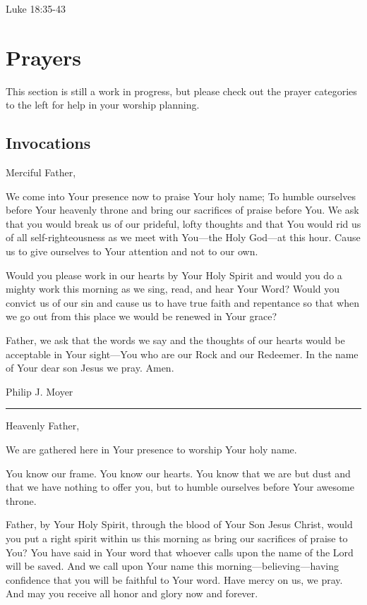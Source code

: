 \documentclass[]{book}
\begin{document}
Luke 18:35-43 \textbar{}

\chapter{Prayers}\label{prayers}

This section is still a work in progress, but please check out the
prayer categories to the left for help in your worship planning.

\section{Invocations}\label{invocations}

Merciful Father,

We come into Your presence now to praise Your holy name; To humble
ourselves before Your heavenly throne and bring our sacrifices of praise
before You. We ask that you would break us of our prideful, lofty
thoughts and that You would rid us of all self-righteousness as we meet
with You---the Holy God---at this hour. Cause us to give ourselves to
Your attention and not to our own.

Would you please work in our hearts by Your Holy Spirit and would you do
a mighty work this morning as we sing, read, and hear Your Word? Would
you convict us of our sin and cause us to have true faith and repentance
so that when we go out from this place we would be renewed in Your
grace?

Father, we ask that the words we say and the thoughts of our hearts
would be acceptable in Your sight---You who are our Rock and our
Redeemer. In the name of Your dear son Jesus we pray. Amen.

Philip J. Moyer

\begin{center}\rule{0.5\linewidth}{\linethickness}\end{center}

Heavenly Father,

We are gathered here in Your presence to worship Your holy name.

You know our frame. You know our hearts. You know that we are but dust
and that we have nothing to offer you, but to humble ourselves before
Your awesome throne.

Father, by Your Holy Spirit, through the blood of Your Son Jesus Christ,
would you put a right spirit within us this morning as bring our
sacrifices of praise to You? You have said in Your word that whoever
calls upon the name of the Lord will be saved. And we call upon Your
name this morning---believing---having confidence that you will be
faithful to Your word. Have mercy on us, we pray. And may you receive
all honor and glory now and forever.
\end{document}
